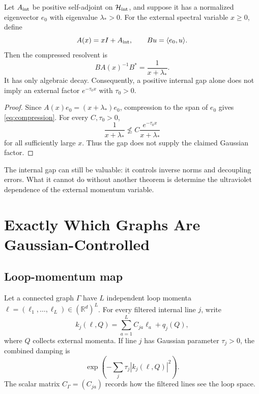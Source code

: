 \documentclass[11pt]{article}
\newcommand{\RR}{\mathbb{R}}
\newcommand{\cH}{\mathcal{H}}
\begin{document}
\begin{theorem}
\label{thm:gap-fails}
Let \(A_{\rm int}\) be positive self-adjoint on \(\cH_{\rm int}\), and suppose
it has a normalized eigenvector \(e_0\) with eigenvalue
\(\lambda_\ast>0\). For the external spectral variable \(x\geq0\), define
\[
 A(x)=xI+A_{\rm int},
 \qquad
 Bu=\langle e_0,u\rangle.
\]
Then the compressed resolvent is
\begin{equation}
 BA(x)^{-1}B^\ast=\frac{1}{x+\lambda_\ast}.
 \label{eq:compression}
\end{equation}
It has only algebraic decay. Consequently, a positive internal gap alone
does not imply an external factor \(e^{-\tau_0x}\) with \(\tau_0>0\).
\end{theorem}

\begin{proof}
Since \(A(x)e_0=(x+\lambda_\ast)e_0\), compression to the span of \(e_0\)
gives \eqref{eq:compression}. For every \(C,\tau_0>0\),
\[
 \frac{1}{x+\lambda_\ast}
 \not\leq
 C\frac{e^{-\tau_0x}}{x+\lambda_\ast}
\]
for all sufficiently large \(x\). Thus the gap does not supply the claimed
Gaussian factor.
\end{proof}

The internal gap can still be valuable: it controls inverse norms and
decoupling errors. What it cannot do without another theorem is determine
the ultraviolet dependence of the external momentum variable.

\section{Exactly Which Graphs Are Gaussian-Controlled}

\subsection{Loop-momentum map}

Let a connected graph \(\Gamma\) have \(L\) independent loop momenta
\(\ell=(\ell_1,\ldots,\ell_L)\in(\RR^d)^L\). For every filtered internal
line \(j\), write
\begin{equation}
 k_j(\ell,Q)=\sum_{a=1}^L C_{ja}\ell_a+q_j(Q),
 \label{eq:line-momentum}
\end{equation}
where \(Q\) collects external momenta. If line \(j\) has Gaussian parameter
\(\tau_j>0\), the combined damping is
\[
 \exp\!\left(-\sum_j\tau_j|k_j(\ell,Q)|^2\right).
\]
The scalar matrix \(C_\Gamma=(C_{ja})\) records how the filtered lines see the
loop space.
\end{document}
